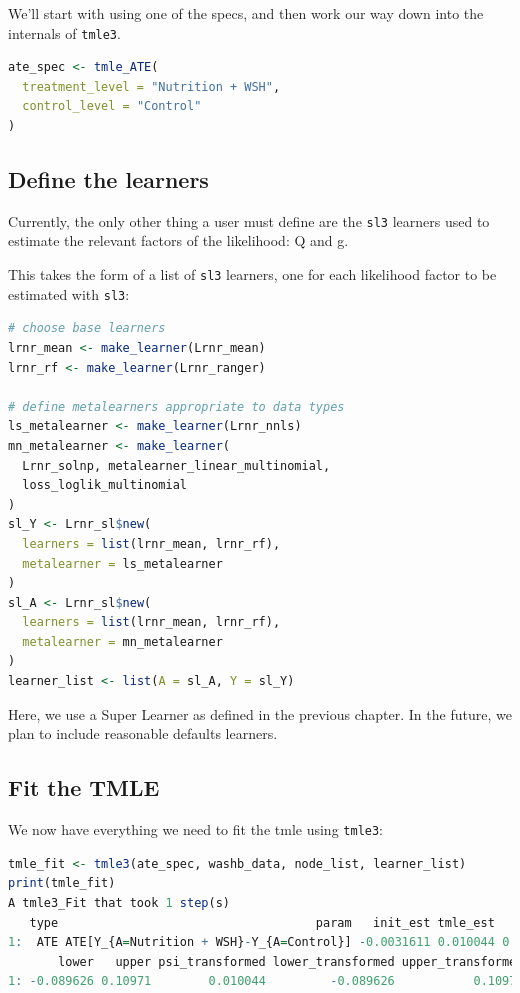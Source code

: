 \documentclass[
  12pt, krantz2,
]{book}
\newcommand{\passthrough}[1]{#1}
\theoremstyle{definition}
\theoremstyle{definition}
\theoremstyle{definition}
\newcommand{\1}{\mathbbm{1}}
\begin{document}
We'll start with using one of the specs, and then work our way down into the
internals of \passthrough{\lstinline!tmle3!}.

\begin{lstlisting}[language=R]
ate_spec <- tmle_ATE(
  treatment_level = "Nutrition + WSH",
  control_level = "Control"
)
\end{lstlisting}

\hypertarget{define-the-learners}{%
\subsection{Define the learners}\label{define-the-learners}}

Currently, the only other thing a user must define are the \passthrough{\lstinline!sl3!} learners used
to estimate the relevant factors of the likelihood: Q and g.

This takes the form of a list of \passthrough{\lstinline!sl3!} learners, one for each likelihood factor
to be estimated with \passthrough{\lstinline!sl3!}:

\begin{lstlisting}[language=R]
# choose base learners
lrnr_mean <- make_learner(Lrnr_mean)
lrnr_rf <- make_learner(Lrnr_ranger)

# define metalearners appropriate to data types
ls_metalearner <- make_learner(Lrnr_nnls)
mn_metalearner <- make_learner(
  Lrnr_solnp, metalearner_linear_multinomial,
  loss_loglik_multinomial
)
sl_Y <- Lrnr_sl$new(
  learners = list(lrnr_mean, lrnr_rf),
  metalearner = ls_metalearner
)
sl_A <- Lrnr_sl$new(
  learners = list(lrnr_mean, lrnr_rf),
  metalearner = mn_metalearner
)
learner_list <- list(A = sl_A, Y = sl_Y)
\end{lstlisting}

Here, we use a Super Learner as defined in the previous chapter. In the future,
we plan to include reasonable defaults learners.

\hypertarget{fit-the-tmle}{%
\subsection{Fit the TMLE}\label{fit-the-tmle}}

We now have everything we need to fit the tmle using \passthrough{\lstinline!tmle3!}:

\begin{lstlisting}[language=R]
tmle_fit <- tmle3(ate_spec, washb_data, node_list, learner_list)
print(tmle_fit)
A tmle3_Fit that took 1 step(s)
   type                                    param   init_est tmle_est       se
1:  ATE ATE[Y_{A=Nutrition + WSH}-Y_{A=Control}] -0.0031611 0.010044 0.050853
       lower   upper psi_transformed lower_transformed upper_transformed
1: -0.089626 0.10971        0.010044         -0.089626           0.10971
\end{lstlisting}
\end{document}
